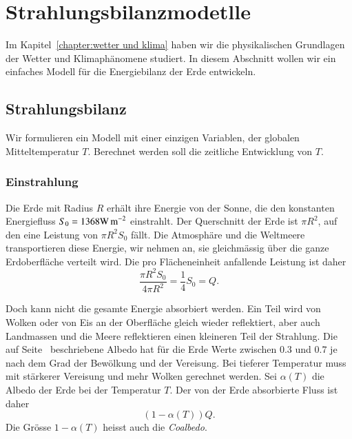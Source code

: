 %
%
%
\section{Strahlungsbilanzmodetlle\label{skript:section:bodyko}}
Im Kapitel~\ref{chapter:wetter und klima} haben wir die physikalischen
Grundlagen der Wetter und Klimaphänomene studiert.
In diesem Abschnitt wollen wir ein einfaches Modell für die Energiebilanz
der Erde entwickeln.

\subsection{Strahlungsbilanz\label{skript:subsection:strahlungsbilanz}}
Wir formulieren ein Modell mit einer einzigen Variablen, der globalen
Mitteltemperatur $T$.
Berechnet werden soll die zeitliche Entwicklung von $T$.

\subsubsection{Einstrahlung}
Die Erde mit Radius $R$ erhält ihre Energie von der Sonne, die
den konstanten Energiefluss $S_0 = 1368 \text{W\,m}^{-2}$
einstrahlt.
Der Querschnitt der Erde ist $\pi R^2$, auf den eine Leistung von
$\pi R^2 S_0$ fällt.
Die Atmosphäre und die Weltmeere transportieren diese Energie, wir nehmen
an, sie gleichmässig über die ganze Erdoberfläche verteilt wird.
Die pro Flächeneinheit anfallende Leistung ist daher
\begin{equation}
\frac{\pi R^2 S_0}{4\pi R^2} = \frac14S_0=Q.
\label{skript:bilanz:einstrahlung}
\end{equation}

Doch kann nicht die gesamte Energie absorbiert werden.
Ein Teil wird von Wolken oder von Eis an der Oberfläche 
gleich wieder reflektiert, aber auch Landmassen und die Meere reflektieren
einen kleineren Teil der Strahlung.
Die auf Seite~\pageref{skript:subsubsection:albedo} beschriebene Albedo
hat für die Erde Werte zwischen $0.3$ und $0.7$ je nach dem Grad der
Bewölkung und der Vereisung.
Bei tieferer Temperatur muss mit stärkerer Vereisung und mehr Wolken
gerechnet werden.
Sei $\alpha(T)$ die Albedo der Erde bei der Temperatur $T$.
Der von der Erde absorbierte Fluss ist daher
\begin{equation}
(1-\alpha(T)) Q.
\label{skript:bilanz:ausstrahlung}
\end{equation}
Die Grösse $1-\alpha(T)$ heisst auch die {\em Coalbedo}.
%

